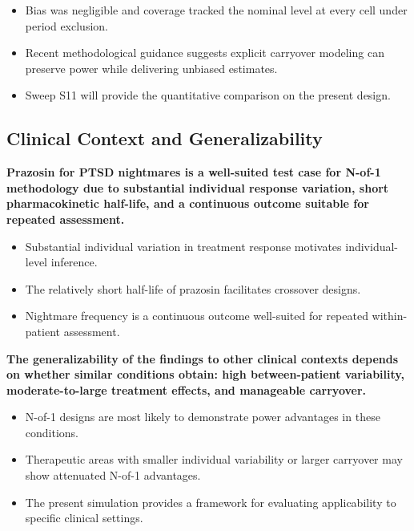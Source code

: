 \documentclass[
  11pt,
]{article}
\begin{document}
\begin{itemize}\setlength{\itemsep}{2pt}\setlength{\parskip}{0pt}
\item Bias was negligible and coverage tracked the nominal level at every cell under period exclusion.
\item Recent methodological guidance suggests explicit carryover modeling can preserve power while delivering unbiased estimates.
\item Sweep S11 will provide the quantitative comparison on the present design.
\end{itemize}

\subsection{Clinical Context and Generalizability}\label{clinical-context-and-generalizability}

\textbf{Prazosin for PTSD nightmares is a well-suited test case for N-of-1 methodology due to substantial individual response variation, short pharmacokinetic half-life, and a continuous outcome suitable for repeated assessment.}

\begin{itemize}\setlength{\itemsep}{2pt}\setlength{\parskip}{0pt}
\item Substantial individual variation in treatment response motivates individual-level inference.
\item The relatively short half-life of prazosin facilitates crossover designs.
\item Nightmare frequency is a continuous outcome well-suited for repeated within-patient assessment.
\end{itemize}

\textbf{The generalizability of the findings to other clinical contexts depends on whether similar conditions obtain: high between-patient variability, moderate-to-large treatment effects, and manageable carryover.}

\begin{itemize}\setlength{\itemsep}{2pt}\setlength{\parskip}{0pt}
\item N-of-1 designs are most likely to demonstrate power advantages in these conditions.
\item Therapeutic areas with smaller individual variability or larger carryover may show attenuated N-of-1 advantages.
\item The present simulation provides a framework for evaluating applicability to specific clinical settings.
\end{itemize}
\end{document}
